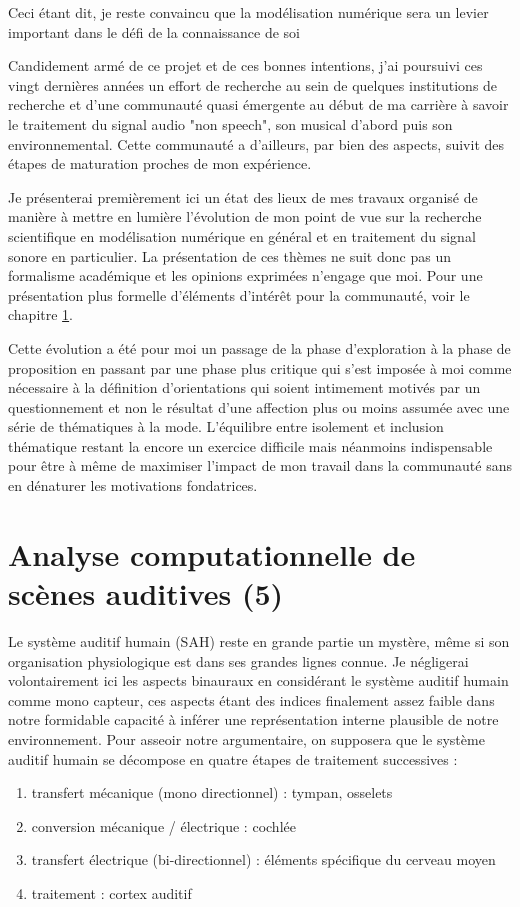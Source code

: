 Ceci étant dit, je reste convaincu que la modélisation numérique sera un levier important dans le défi de la connaissance de soi

Candidement armé de ce projet et de ces bonnes intentions, j'ai poursuivi ces vingt dernières années un effort de recherche au sein de quelques institutions de recherche et d'une communauté quasi émergente au début de ma carrière à savoir le traitement du signal audio "non speech", son musical d'abord puis son environnemental. Cette communauté a d'ailleurs, par bien des aspects, suivit des étapes de maturation proches de mon expérience.

Je présenterai premièrement ici un état des lieux de mes travaux organisé de manière à mettre en lumière l'évolution de mon point de vue sur la recherche scientifique en modélisation numérique en général et en traitement du signal sonore en particulier. La présentation de ces thèmes ne suit donc pas un formalisme académique et les opinions exprimées n'engage que moi. Pour une présentation plus formelle d'éléments d'intérêt pour la communauté, voir le chapitre \ref{}.

Cette évolution a été pour moi un passage de la phase d'exploration à la phase de proposition en passant par une phase plus critique qui s'est imposée à moi comme nécessaire à la définition d'orientations qui soient intimement motivés par un questionnement et non le résultat d'une affection plus ou moins assumée avec une série de thématiques à la mode. L'équilibre entre isolement et inclusion thématique restant la encore un exercice difficile mais néanmoins indispensable pour être à même de maximiser l'impact de mon travail dans la communauté sans en dénaturer les motivations fondatrices.

\section{Analyse computationnelle de scènes auditives (5)}

Le système auditif humain (SAH) reste en grande partie un mystère, même si son organisation physiologique est dans ses grandes lignes connue. Je négligerai volontairement ici les aspects binauraux en considérant le système auditif humain comme mono capteur, ces aspects étant des indices finalement assez faible dans notre formidable capacité à inférer une représentation interne plausible de notre environnement. Pour asseoir notre argumentaire, on supposera que le système auditif humain se décompose en quatre étapes de traitement successives :
\begin{enumerate}
  \item transfert mécanique (mono directionnel) : tympan, osselets
  \item conversion mécanique / électrique : cochlée
  \item transfert électrique (bi-directionnel) : éléments spécifique du cerveau moyen
  \item traitement : cortex auditif
\end{enumerate}


